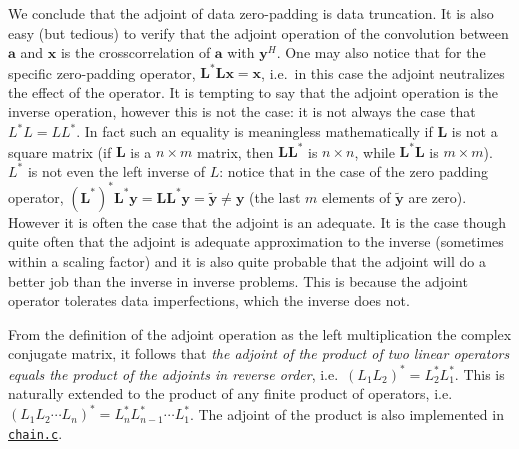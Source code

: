 We conclude that the adjoint of data zero-padding is data truncation. It is also easy (but tedious) to verify that the adjoint operation of the convolution between $\mathbf{a}$ and $\mathbf{x}$ is the  crosscorrelation of $\mathbf{a}$ with $\mathbf{y}^H$. One may also notice that for the specific zero-padding operator, $\mathbf{L}^{*}\mathbf{L}\mathbf{x} = \mathbf{x}$, i.e.~in this case the adjoint neutralizes the effect of the operator. It is tempting to say that the adjoint operation is the inverse operation, however this is not the case: it is not always the case that $L^*L = LL^*$. In fact such an equality is meaningless mathematically if $\mathbf{L}$ is not a square matrix (if $\mathbf{L}$ is a $n\times m$ matrix, then $\mathbf{L}\mathbf{L}^{*}$ is $n\times n$, while $\mathbf{L}^{*}\mathbf{L}$ is $m\times m$). $L^*$ is not even the left inverse of $L$: notice that in the case of the zero padding operator, $(\mathbf{L}^*)^*\mathbf{L}^{*}\mathbf{y}=\mathbf{L}\mathbf{L}^{*}\mathbf{y}=\tilde{\mathbf{y}} \neq \mathbf{y}$ (the last $m$ elements of $\tilde{\mathbf{y}}$ are zero). However it is often the case that the adjoint is an adequate. It is the case though quite often that the adjoint is adequate approximation to the inverse (sometimes within a scaling factor) and it is also quite probable that the adjoint will do a better job than the inverse in inverse problems. This is because the adjoint operator tolerates data imperfections, which the inverse does not.

From the definition of the adjoint operation as the left multiplication the complex conjugate matrix, it follows that {\it the adjoint of the product of two linear operators equals the product of the adjoints in reverse order}, i.e.~$(L_1L_2)^*=L_2^*L_1^*$. This is naturally extended to the product of any finite product of operators, i.e.~$(L_1L_2\cdots L_n)^*=L_n^*L_{n-1}^*\cdots L_1^*$. The adjoint of the product is also implemented in \hyperref[sec:chain]{\texttt{chain.c}}.


